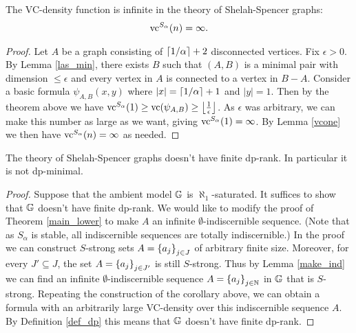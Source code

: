 \begin{Corollary}
  The VC-density function is infinite in the theory of Shelah-Spencer graphs:
  \begin{align*}
    \operatorname{vc}^{S_\alpha}(n) = \infty.
  \end{align*}
\end{Corollary}

\begin{proof}
  Let $A$ be a graph consisting of $\left \lceil 1/\alpha \right \rceil + 2$ disconnected vertices.
  Fix $\epsilon > 0$.
  By Lemma \ref{las_min}, there exists $B$ such that $(A, B)$ is a minimal pair with dimension $\leq \epsilon$ and
  every vertex in $A$ is connected to a vertex in $B - A$.
  Consider a basic formula $\psi_{A, B}(x, y)$ where $|x| = \left \lceil 1/\alpha \right \rceil + 1$ and $|y| = 1$.
  Then by the theorem above we have $\operatorname{vc}^{S_\alpha}(1) \geq \operatorname{vc} (\psi_{A,B}) \geq \left \lfloor \frac{1}{\epsilon} \right \rfloor$.
  As $\epsilon$ was arbitrary, we can make this number as large as we want, giving $\operatorname{vc}^{S_\alpha}(1) = \infty$.
  By Lemma \ref{vcone} we then have $\operatorname{vc}^{S_\alpha}(n) = \infty$ as needed.
\end{proof}

\begin{Corollary}
  The theory of Shelah-Spencer graphs doesn't have finite dp-rank.
  In particular it is not dp-minimal.
\end{Corollary}

\begin{proof}
  Suppose that the ambient model $\mathbb G$ is $\aleph_1$-saturated.
  It suffices to show that $\mathbb G$ doesn't have finite dp-rank.
  We would like to modify the proof of Theorem \ref{main_lower} to make $A$ an infinite $\emptyset$-indiscernible sequence.
  (Note that as $S_\alpha$ is stable, all indiscernible sequences are totally indiscernible.)
  In the proof we can construct $S$-strong sets $A = \left\{a_j\right\}_{j \in J}$ of arbitrary finite size.
  Moreover, for every $J' \subseteq J$, the set $A = \left\{a_j\right\}_{j \in J'}$ is still $S$-strong.
  Thus by Lemma \ref{make_ind} we can find an infinite $\emptyset$-indiscernible sequence $A = \left\{a_j\right\}_{j \in \mathbb{N}}$ in $\mathbb G$ that is $S$-strong.
  Repeating the construction of the corollary above,
  we can obtain a formula with an arbitrarily large VC-density over this indiscernible sequence $A$.
  By Definition \ref{def_dp} this means that $\mathbb G$ doesn't have finite dp-rank.
\end{proof}



